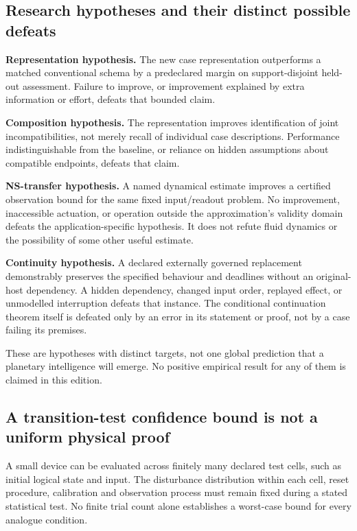 \documentclass[11pt,a4paper]{article}
\theoremstyle{definition}
\theoremstyle{remark}
\begin{document}
\subsection{Research hypotheses and their distinct possible defeats}
\textbf{Representation hypothesis.} The new case representation outperforms a matched conventional schema by a predeclared margin on support-disjoint held-out assessment. Failure to improve, or improvement explained by extra information or effort, defeats that bounded claim.

\textbf{Composition hypothesis.} The representation improves identification of joint incompatibilities, not merely recall of individual case descriptions. Performance indistinguishable from the baseline, or reliance on hidden assumptions about compatible endpoints, defeats that claim.

\textbf{NS-transfer hypothesis.} A named dynamical estimate improves a certified observation bound for the same fixed input/readout problem. No improvement, inaccessible actuation, or operation outside the approximation's validity domain defeats the application-specific hypothesis. It does not refute fluid dynamics or the possibility of some other useful estimate.

\textbf{Continuity hypothesis.} A declared externally governed replacement demonstrably preserves the specified behaviour and deadlines without an original-host dependency. A hidden dependency, changed input order, replayed effect, or unmodelled interruption defeats that instance. The conditional continuation theorem itself is defeated only by an error in its statement or proof, not by a case failing its premises.

These are hypotheses with distinct targets, not one global prediction that a planetary intelligence will emerge. No positive empirical result for any of them is claimed in this edition.

\subsection{A transition-test confidence bound is not a uniform physical proof}\label{subsec:transitiontest}
A small device can be evaluated across finitely many declared test cells, such as initial logical state and input. The disturbance distribution within each cell, reset procedure, calibration and observation process must remain fixed during a stated statistical test. No finite trial count alone establishes a worst-case bound for every analogue condition.
\end{document}
